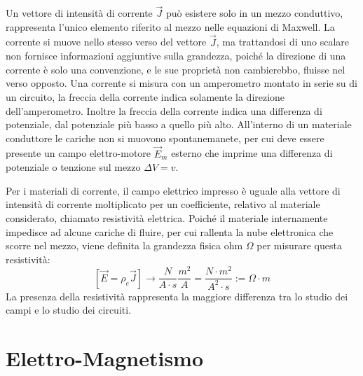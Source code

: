 \documentclass{article}
\numberwithin{equation}{subsection}
\begin{document}
Un vettore di intensità di corrente $\vec{J}$ può esistere solo in un mezzo conduttivo, rappresenta l'unico elemento riferito al mezzo nelle equazioni di Maxwell. La corrente 
si muove nello stesso verso del vettore $\vec{J}$, ma trattandosi di uno scalare non fornisce informazioni aggiuntive sulla grandezza, poiché la direzione di una corrente è 
solo una convenzione, e le sue proprietà non cambierebbo, fluisse nel verso opposto. Una corrente si misura con un amperometro montato in serie su di un circuito, la freccia 
della corrente indica solamente la direzione dell'amperometro. Inoltre la freccia della corrente indica una differenza di potenziale, dal potenziale più basso a quello 
più alto. All'interno di un materiale conduttore le cariche non si muovono spontanemanete, per cui deve essere presente un campo elettro-motore $\vec{E}_m$ esterno che imprime 
una differenza di potenziale o tenzione sul mezzo $\Delta V=v$. 

\begin{center}
\end{center}

Per i materiali di corrente, il campo elettrico impresso è uguale alla vettore di intensità di corrente moltiplicato per un coefficiente, relativo al materiale considerato, 
chiamato resistività elettrica. Poiché il materiale internamente impedisce ad alcune cariche di fluire, per cui rallenta la nube elettronica che scorre nel mezzo, viene 
definita la grandezza fisica ohm $\Omega$ per misurare questa resistività:
\begin{equation*}
    \displaystyle\left[\vec{E}=\rho_{e}\vec{J}\right]\to\frac{N}{A\cdot s}\frac{m^2}{A}=\frac{N\cdot m^2}{A^2\cdot s}:=\Omega\cdot m
\end{equation*}
La presenza della resistività rappresenta la maggiore differenza tra lo studio dei campi e lo studio dei circuiti. 

\clearpage

\section{Elettro-Magnetismo}
\end{document}

